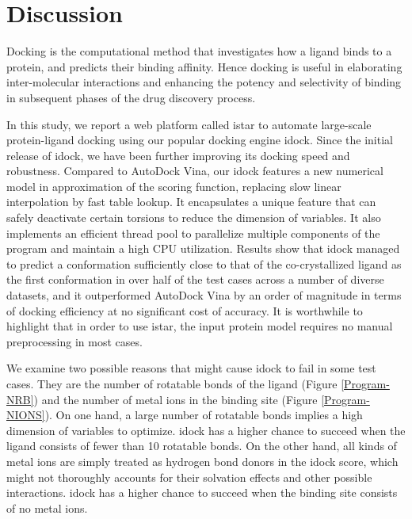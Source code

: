 \documentclass[10pt]{article}
\begin{document}
\section*{Discussion}
Docking is the computational method that investigates how a ligand binds to a protein, and predicts their binding affinity. Hence docking is useful in elaborating inter-molecular interactions and enhancing the potency and selectivity of binding in subsequent phases of the drug discovery process.

In this study, we report a web platform called istar to automate large-scale protein-ligand docking using our popular docking engine idock. Since the initial release of idock, we have been further improving its docking speed and robustness. Compared to AutoDock Vina, our idock features a new numerical model in approximation of the scoring function, replacing slow linear interpolation by fast table lookup. It encapsulates a unique feature that can safely deactivate certain torsions to reduce the dimension of variables. It also implements an efficient thread pool to parallelize multiple components of the program and maintain a high CPU utilization. Results show that idock managed to predict a conformation sufficiently close to that of the co-crystallized ligand as the first conformation in over half of the test cases across a number of diverse datasets, and it outperformed AutoDock Vina by an order of magnitude in terms of docking efficiency at no significant cost of accuracy. It is worthwhile to highlight that in order to use istar, the input protein model requires no manual preprocessing in most cases.

We examine two possible reasons that might cause idock to fail in some test cases. They are the number of rotatable bonds of the ligand (Figure \ref{Program-NRB}) and the number of metal ions in the binding site (Figure \ref{Program-NIONS}). On one hand, a large number of rotatable bonds implies a high dimension of variables to optimize. idock has a higher chance to succeed when the ligand consists of fewer than 10 rotatable bonds. On the other hand, all kinds of metal ions are simply treated as hydrogen bond donors in the idock score, which might not thoroughly accounts for their solvation effects and other possible interactions. idock has a higher chance to succeed when the binding site consists of no metal ions.
\end{document}

